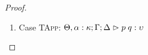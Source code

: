 \begin{proof}
\begin{enumerate}
  First, the syntax:
  \begin{tabbedproof}
    \oo By inversion, $\judgeA[\Theta, \alpha:\kappa, \beta:\kappa'; \Gamma; \Delta]{p}{\upsilon}$ \\
    \oo By induction, $\judgeA[\Theta, \beta:\kappa'; {[\tau/\alpha]}\Gamma; {[\tau/\alpha]}\Delta]{{[\tau/\alpha]}p}{{[\tau/\alpha]}\upsilon}$ \\
    \oo By rule, $\judgeA[\Theta; {[\tau/\alpha]}\Gamma; {[\tau/\alpha]}\Delta]{\pfunall{\beta}{\kappa'}{{[\tau/\alpha]}p}}{\forallsort{\beta}{\kappa'}{{[\tau/\alpha]}\upsilon}}$ \\
    \oo By def of subst, $\judgeA[\Theta; {[\tau/\alpha]}\Gamma; {[\tau/\alpha]}\Delta]{{[\tau/\alpha]}(\pfunall{\beta}{\kappa'}{p})}{{[\tau/\alpha]}\forallsort{\beta}{\kappa'}{\upsilon}}$ \\
  \end{tabbedproof}
  For semantics, consider $\interp{\judgeA[\Theta; 
                                           {[\tau/\alpha]}\Gamma; 
                                           {[\tau/\alpha]}\Delta]
                                          {{[\tau/\alpha]}(\pfun{\beta}{\kappa'}{p})}
                                          {{[\tau/\alpha]}(\forallsort{\beta}{\kappa'}{\upsilon})}}
                                  \;\theta\;\gamma\;\delta$ \\
  \begin{eqnproof}
          {Semantics}
          {Induction}
          {Semantics}
  \end{eqnproof}
  The correctness of the application of $\gamma$ and $\delta$ follows from the equations for contexts
  under substitution. We also silently permuted the context at the second step, and made use of the fact
  that $\beta$ is not free in $\Gamma$ or $\Delta$.

\item Case \textsc{TApp}: $\judgeA[\Theta, \alpha:\kappa; \Gamma; \Delta]{p\;q}{\upsilon}$
  

\end{enumerate}
\end{proof}
